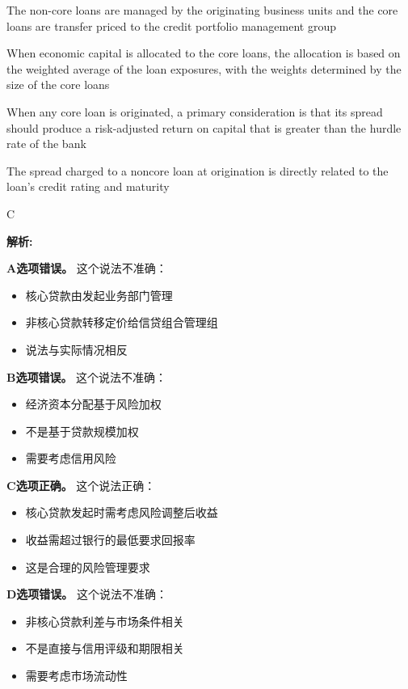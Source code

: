 \documentclass{article}
\newenvironment{explanation}
{\textbf{解析:}\par}
{\par}
\begin{document}
\begin{choices}
    \item The non-core loans are managed by the originating business units and the core loans are transfer priced to the credit portfolio management group
    \item When economic capital is allocated to the core loans, the allocation is based on the weighted average of the loan exposures, with the weights determined by the size of the core loans
    \item When any core loan is originated, a primary consideration is that its spread should produce a risk-adjusted return on capital that is greater than the hurdle rate of the bank
    \item The spread charged to a noncore loan at origination is directly related to the loan's credit rating and maturity
\end{choices}

\begin{correctanswer}
    C
\end{correctanswer}

\begin{explanation}
    \textbf{A选项错误。}
    这个说法不准确：
    \begin{itemize}
        \item 核心贷款由发起业务部门管理
        \item 非核心贷款转移定价给信贷组合管理组
        \item 说法与实际情况相反
    \end{itemize}

    \textbf{B选项错误。}
    这个说法不准确：
    \begin{itemize}
        \item 经济资本分配基于风险加权
        \item 不是基于贷款规模加权
        \item 需要考虑信用风险
    \end{itemize}

    \textbf{C选项正确。}
    这个说法正确：
    \begin{itemize}
        \item 核心贷款发起时需考虑风险调整后收益
        \item 收益需超过银行的最低要求回报率
        \item 这是合理的风险管理要求
    \end{itemize}

    \textbf{D选项错误。}
    这个说法不准确：
    \begin{itemize}
        \item 非核心贷款利差与市场条件相关
        \item 不是直接与信用评级和期限相关
        \item 需要考虑市场流动性
    \end{itemize}
\end{explanation}
\end{document}
